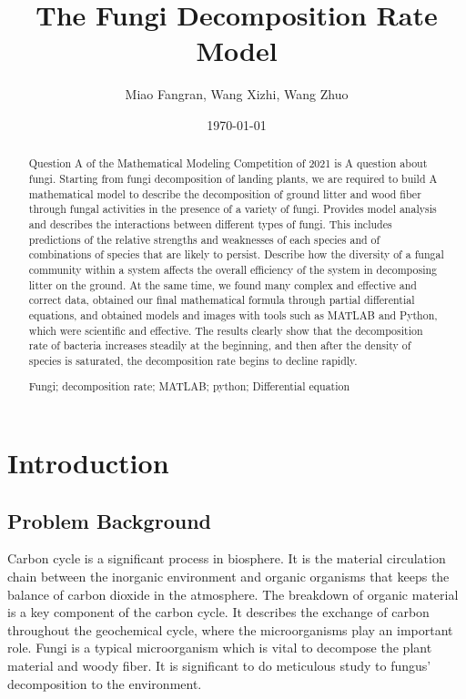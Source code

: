 \documentclass{mcmthesis}
\title{The Fungi Decomposition Rate Model}
\author{Miao Fangran, Wang Xizhi, Wang Zhuo}
\date{\today}
\begin{document}
\begin{abstract}
  Question A of the Mathematical Modeling Competition of 2021 is A question about fungi. 
  Starting from fungi decomposition of landing plants, we are required to build A mathematical model to describe the decomposition of ground litter and wood fiber through fungal activities in the presence of a variety of fungi. 
  Provides model analysis and describes the interactions between different types of fungi. 
  This includes predictions of the relative strengths and weaknesses of each species and of combinations of species that are likely to persist. 
  Describe how the diversity of a fungal community within a system affects the overall efficiency of the system in decomposing litter on the ground.
  At the same time, we found many complex and effective and correct data, obtained our final mathematical formula through partial differential equations, and obtained models and images with tools such as MATLAB and Python, which were scientific and effective.
  The results clearly show that the decomposition rate of bacteria increases steadily at the beginning, and then after the density of species is saturated, the decomposition rate begins to decline rapidly.
\begin{keywords}
  Fungi; decomposition rate; MATLAB; python; Differential equation
\end{keywords}
\end{abstract}
\maketitle
\tableofcontents
\newpage
\section{Introduction}
\subsection{Problem Background}
Carbon cycle is a significant process in biosphere. 
It is the material circulation chain between the inorganic environment and organic organisms that keeps the balance of carbon dioxide in the atmosphere. 
The breakdown of organic material is a key component of the carbon cycle. 
It describes the exchange of carbon throughout the geochemical cycle, where the microorganisms play an important role. 
Fungi is a typical microorganism which is vital to decompose the plant material and woody fiber. 
It is significant to do meticulous study to fungus’ decomposition to the environment.
\end{document}

